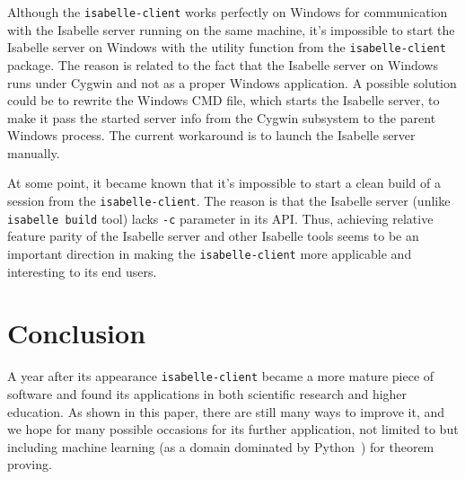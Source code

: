 \documentclass[runningheads]{llncs}
\begin{document}
Although the \texttt{isabelle-client} works perfectly on Windows for communication with the Isabelle server running on the same machine, it's impossible to start the Isabelle server on Windows with the utility function from the \texttt{isabelle-client} package. The reason is related to the fact that the Isabelle server on Windows runs under Cygwin and not as a proper Windows application. A possible solution could be to rewrite the Windows CMD file, which starts the Isabelle server, to make it pass the started server info from the Cygwin subsystem to the parent Windows process. The current workaround is to launch the Isabelle server manually.

At some point, it became known that it's impossible to start a clean build of a session from the \texttt{isabelle-client}. The reason is that the Isabelle server (unlike \texttt{isabelle build} tool) lacks \texttt{-c} parameter in its API. Thus, achieving relative feature parity of the Isabelle server and other Isabelle tools seems to be an important direction in making the \texttt{isabelle-client} more applicable and interesting to its end users.
\section{Conclusion}
A year after its appearance \texttt{isabelle-client} became a more mature piece of software and found its applications in both scientific research and higher education. As shown in this paper, there are still many ways to improve it, and we hope for many possible occasions for its further application, not limited to but including machine learning (as a domain dominated by Python~\cite{KaggleReport}) for theorem proving.


\end{document}

